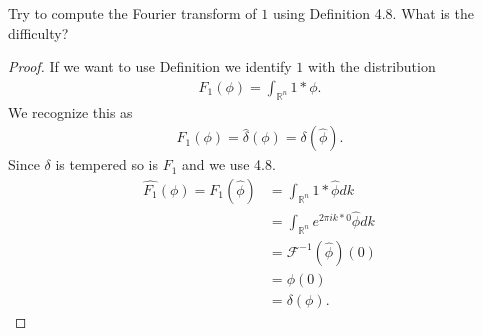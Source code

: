   \begin{exercise}[g]
   Try to compute the Fourier transform of $1$ using Definition 4.8. What is the difficulty? 
  \end{exercise}
  \begin{proof}
   If we want to use Definition we identify $1$ with the distribution 
   \begin{align*}
     F_1(\phi ) = \int_{\mathbb{R}^{n}}  1*\phi 
   .\end{align*}
   We recognize this as 
   \begin{align*}
    F_1(\phi ) = \hat{\delta}(\phi )=  \delta(\hat{\phi } )
   .\end{align*}
   Since $\delta $ is tempered so is $F_1$ and we use 4.8.
   \begin{align*}
     \hat{F_1}(\phi )  = F_1(\hat{\phi } ) &= \int_{\mathbb{R}^{n} } 1*\hat{\phi}  dk\\
                                           &= \int_{\mathbb{R}^{n} } e^{2\pi ik*0} \hat{\phi } dk\\
                                           &= \mathcal{F}^{-1}(\hat{\phi})(0)\\
                                           &= \phi(0)\\
                                           &= \delta(\phi )
   .\end{align*}
  \end{proof}
